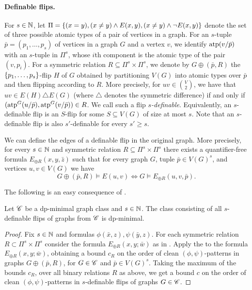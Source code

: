 \paragraph*{Definable flips.}
For $s \in \mathbb N$, let $\Pi=\{(x=y), (x\neq y)\land E(x,y),(x\neq y)\land \neg E(x,y)\}$ denote the set of three possible atomic types of a pair of vertices in a graph.
For an $s$-tuple $\bar p=(p_1,\ldots,p_s)$ of vertices in a graph $G$ and a vertex $v$,
we identify $\textnormal{atp}(v/\bar p)$ with an $s$-tuple in $\Pi^s$, whose $i$th component is the atomic type of the pair $(v,p_i)$.
For a symmetric relation $R \subseteq \Pi^s \times \Pi^s$, we denote by $G \oplus (\bar p, R)$ the $\{p_1,\ldots,p_s\}$-flip $H$ of $G$ obtained by partitioning $V(G)$ into atomic types over $\bar p$ and then flipping according to $R$.
More precisely, for $uv\in \binom{V}{2}$,
we have that $uv\in E(H)\triangle E(G)$ (where $\triangle$ denotes the symmetric difference) if and only if $(\textnormal{atp}^G(u/\bar p), \textnormal{atp}^G(v/ \bar p)) \in R$.
We call such a flip \emph{$s$-definable}.
Equivalently, an $s$-definable flip is an $S$-flip for some $S\subseteq V(G)$ of size at most $s$.
Note that an $s$-definable flip is also $s'$-definable for every $s'\ge s$.


\begin{observation}\label{obs:sim-def-flip}
    We can define the edges of a definable flip in the original graph.
    More precisely, for every $s\in\mathbb N$ and symmetric relation $R \subseteq \Pi^s \times \Pi^s$ there exists a quantifier-free formula $E_{\oplus R}(x,y,\bar z)$ such that for every graph $G$, tuple $\bar p \in V(G)^s$, and vertices $u,v\in V(G)$ we have 
    \[
        G\oplus(\bar p, R) \models E(u,v)
        \iff
        G \models E_{\oplus R}(u,v,\bar p).
    \]
\end{observation}

The following is an easy consequence of .
\begin{fact}\label{obs:flips-dp-min}
    Let $\mathscr C$ be a dp-minimal graph class and $s\in\mathbb N$.
    The class 
    consisting of all $s$-definable flips of graphs from $\mathscr C$ is dp-minimal.
\end{fact}
\begin{proof}
    Fix $s\in\mathbb N$ and formulas $\phi(\bar x,z),\psi(\bar y,z)$.
    For each symmetric relation $R\subset \Pi^s\times \Pi^s$ %
    consider the formula
    $E_{\oplus R}(x,y;\bar w)$ as in .
    Apply the  to the formula $E_{\oplus R}(x,y;\bar w)$, obtaining a bound $c_R$ on the order of clean $(\phi,\psi)$-patterns in graphs $G\oplus (\bar p,R)$, for $G\in\mathscr C$ and $\bar p\in V(G)^s$.
Taking the maximum of the bounds $c_R$, over all binary relations $R$ as above,
we get a bound $c$ on the order of clean $(\phi,\psi)$-patterns in $s$-definable flips of graphs $G\in\mathscr C$.
\end{proof}


